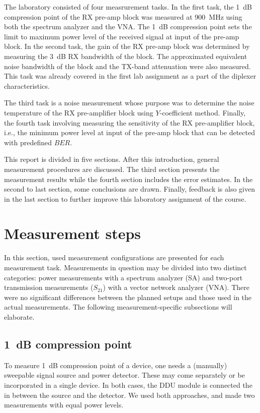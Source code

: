 \documentclass[a4paper, 12pt]{article}
\begin{document}
The laboratory consisted of four measrurement tasks. In the first task, the 1~dB compression 
point of the RX pre-amp block was measured at 900~MHz using both the spectrum analyzer and the 
VNA. The 1~dB compression point sets the limit to maximum power level of the received signal 
at input of the pre-amp block. In the second task, the gain of the RX pre-amp block was 
determined by measuring the 3~dB RX bandwidth of the block. The approximated equivalent 
noise bandwidth of the block and the TX-band attenuation were also measured. This task was 
already covered in the first lab assignment as a part of the diplexer characteristics. 

The third task is a noise measurement whose purpose was to determine the noise temperature of 
the RX pre-amplifier block using $Y$-coefficient method. Finally, the fourth task involving 
measuring the sensitivity of the RX pre-amplifier block, i.e., the minimum power level at 
input of the pre-amp block that can be detected with predefined $\textit{BER}$.

This report is divided in five sections. After this introduction, general measurement procedures 
are discussed. The third section presents the measurement results while the fourth section includes 
the error estimates. In the second to last section, some conclusions are drawn. Finally, feedback 
is also given in the last section to further improve this laboratory assignment of the course.


\newpage
\section{Measurement steps}

In this section, used measurement configurations are presented for each measurement 
task. Measurements in question may be divided into two distinct categories: power 
measurements with a spectrum analyzer (SA) and two-port transmission measurements ($S_{21}$)
with a vector network analyzer (VNA). There were no significant differences between 
the planned setups and those used in the actual measurements. The following 
measurement-specific subsections will elaborate.


\subsection{1~dB compression point}

To measure 1~dB compression point of a device, one needs a (manually) sweepable signal source 
and power detector. These may come separately or be incorporated in a single device. 
In both cases, the DDU module is connected the in between the source and the detector.
We used both approaches, and made two measurements with equal power levels.
\end{document}
